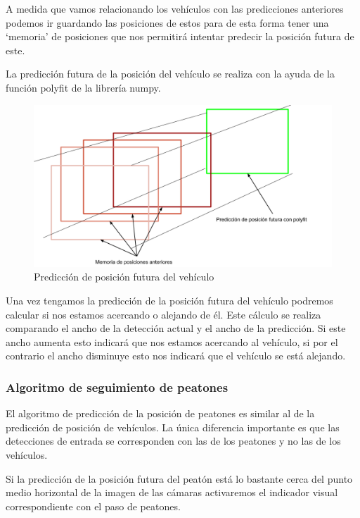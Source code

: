 A medida que vamos relacionando los vehículos con las predicciones anteriores podemos ir guardando las posiciones de estos para de esta forma tener una `memoria' de posiciones que nos permitirá intentar predecir la posición futura de este.

La predicción futura de la posición del vehículo se realiza con la ayuda de la función polyfit de la librería numpy.

\begin{figure}[h!]
    \centering
    \includegraphics[width=\linewidth]{img/Posicionfutura.png}
    \caption{Predicción de posición futura del vehículo}
    \label{fig:posicionfutura}    
\end{figure}

Una vez tengamos la predicción de la posición futura del vehículo podremos calcular si nos estamos acercando o alejando de él. Este cálculo se realiza comparando el ancho de la detección actual y el ancho de la predicción. Si este ancho aumenta esto indicará que nos estamos acercando al vehículo, si por el contrario el ancho disminuye esto nos indicará que el vehículo se está alejando.


\clearpage
\subsubsection{Algoritmo de seguimiento de peatones}
El algoritmo de predicción de la posición de peatones es similar al de la predicción de posición de vehículos. La única diferencia importante es que las detecciones de entrada se corresponden con las de los peatones y no las de los vehículos.

Si la predicción de la posición futura del peatón está lo bastante cerca del punto medio horizontal de la imagen de las cámaras activaremos el indicador visual correspondiente con el paso de peatones.

